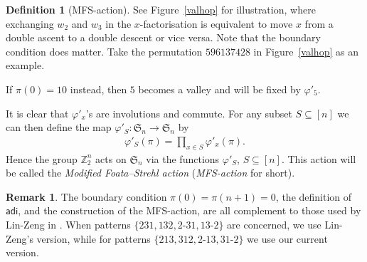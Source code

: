 \documentclass[12pt,reqno]{amsart}
\numberwithin{equation}{section}
\theoremstyle{plain}
\theoremstyle{definition}
\newtheorem{Def}[theorem]{Definition}
\newtheorem{remark}[theorem]{Remark}
\def\Z{\mathbb{Z}}
\def\S{\mathfrak{S}}
\def\ai{\mathsf{adi}}
\def\cab{31\text{-}2}
\def\bca{2\text{-}31}
\def\acb{13\text{-}2}
\def\bac{2\text{-}13}
\begin{document}
\begin{Def}[MFS-action]
See Figure~\ref{valhop} for illustration, where  exchanging
$w_2$ and  $w_3$ in the $x$-factorisation is equivalent to
move $x$  from a double ascent to  a double descent or vice versa. Note that the boundary condition does matter. Take the permutation $596137428$ in Figure~\ref{valhop} as an example.

If $\pi(0)=10$ instead, then $5$ becomes a valley and will be fixed by $\varphi'_5$.

It is clear that $\varphi'_x$'s are involutions and commute. For any subset $S\subseteq[n]$ we can then define the map $\varphi'_S :\S_n\rightarrow\S_n$ by
\begin{align*}
\varphi'_S(\pi)=\prod_{x\in S}\varphi'_x(\pi).
\end{align*}
Hence the group $\Z_2^n$ acts on $\S_n$ via the functions $\varphi'_S$, $S\subseteq[n]$. This action will be called  the {\em Modified Foata--Strehl action} ({\em MFS-action} for short).
\end{Def}

\begin{remark}\label{dual}
The boundary condition $\pi(0)=\pi(n+1)=0$, the definition of $\ai$, and the construction of the MFS-action, are all complement to those used by Lin-Zeng in \cite{LZ15}. When patterns $\{231, 132, \bca, \acb\}$ are concerned, we use Lin-Zeng's version, while for patterns $\{213, 312, \bac, \cab\}$ we use our current version.
\end{remark}
\end{document}
